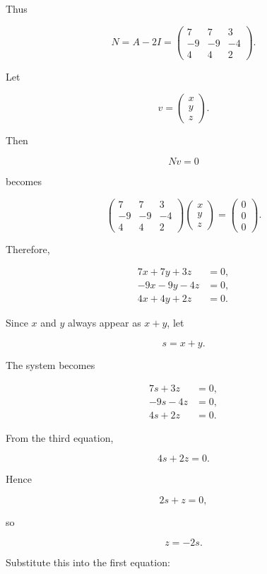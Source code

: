 \documentclass[11pt]{article}
\begin{document}
Thus

\[
\boxed{
N=A-2I
=
\begin{pmatrix}
7&7&3\\
-9&-9&-4\\
4&4&2
\end{pmatrix}.
}
\]

Let

\[
v=
\begin{pmatrix}
x\\
y\\
z
\end{pmatrix}.
\]

Then

\[
Nv=0
\]

becomes

\[
\begin{pmatrix}
7&7&3\\
-9&-9&-4\\
4&4&2
\end{pmatrix}
\begin{pmatrix}
x\\
y\\
z
\end{pmatrix}
=
\begin{pmatrix}
0\\
0\\
0
\end{pmatrix}.
\]

Therefore,

\[
\begin{aligned}
7x+7y+3z&=0,\\
-9x-9y-4z&=0,\\
4x+4y+2z&=0.
\end{aligned}
\]

Since \(x\) and \(y\) always appear as \(x+y\), let

\[
s=x+y.
\]

The system becomes

\[
\begin{aligned}
7s+3z&=0,\\
-9s-4z&=0,\\
4s+2z&=0.
\end{aligned}
\]

From the third equation,

\[
4s+2z=0.
\]

Hence

\[
2s+z=0,
\]

so

\[
z=-2s.
\]

Substitute this into the first equation:
\end{document}
